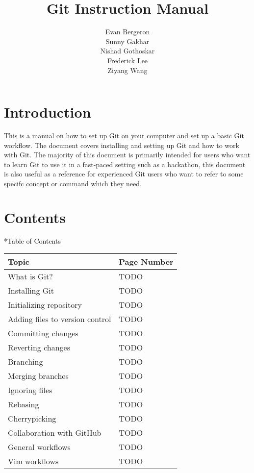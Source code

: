 \documentclass{amsart}
\title{Git Instruction Manual}
\author{Evan Bergeron\\
Sunny Gakhar\\
Nishad Gothoskar\\
Frederick Lee\\
Ziyang Wang
}
\makeatletter
\renewcommand\subsection{\@startsection{subsection}{2}%
  \z@{-.5\linespacing\@plus-.7\linespacing}{.5\linespacing}%
  {\normalfont\scshape}}
\makeatother
\begin{document}
\maketitle

\section*{Introduction}

This is a manual on how to set up Git on your computer and set up a basic Git workflow. The document covers installing and setting up Git and how to work with Git. The majority of this document is primarily intended for users who want to learn Git to use it in a fast-paced setting such as a hackathon, this document is also useful as a reference for experienced Git users who want to refer to some specifc concept or command which they need.

\newpage

\section*{Contents}


\subsection*{Table of Contents}
\begin{center}
	\begin{tabular}{ll}
		Topic & Page Number\\
		\hline
		What is Git? & TODO\\
		Installing Git & TODO \\
		Initializing repository & TODO\\
		Adding files to version control & TODO\\
		Committing changes & TODO\\
		Reverting changes & TODO\\
		Branching & TODO\\
		Merging branches & TODO\\
		Ignoring files & TODO\\
		Rebasing & TODO\\
		Cherrypicking & TODO\\
		Collaboration with GitHub & TODO\\
		General workflows & TODO\\
		Vim workflows & TODO\\

	\end{tabular}
\end{center}
\end{document}
